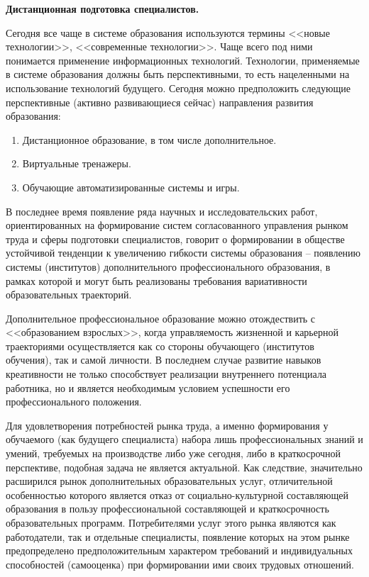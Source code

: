\textbf{Дистанционная подготовка специалистов.}

Сегодня все чаще в системе образования используются термины <<новые технологии>>,
<<современные технологии>>. Чаще всего под ними понимается применение информационных технологий. Технологии, применяемые в системе образования должны быть перспективными, то есть нацеленными на использование технологий будущего.
Сегодня можно предположить следующие перспективные (активно развивающиеся              
сейчас) направления развития образования: 
\begin{enumerate}
  \item Дистанционное образование, в том числе дополнительное. 
  \item Виртуальные тренажеры. 
  \item Обучающие автоматизированные системы и игры. 
\end{enumerate}
В последнее время появление ряда научных и исследовательских работ, ориентированных на формирование систем согласованного управления рынком труда и сферы подготовки специалистов, говорит о формировании в обществе устойчивой тенденции к увеличению гибкости системы образования – появлению системы (институтов) дополнительного профессионального образования, в рамках которой и могут быть реализованы требования вариативности образовательных траекторий.

Дополнительное профессиональное образование можно отождествить с <<образованием взрослых>>, когда управляемость жизненной и карьерной траекториями осуществляется как со стороны обучающего (институтов обучения), так и самой личности. В последнем случае развитие навыков креативности не только способствует реализации внутреннего потенциала работника, но и является необходимым условием успешности его профессионального положения. 

Для удовлетворения потребностей рынка труда, а именно формирования у обучаемого (как будущего специалиста) набора лишь профессиональных знаний и умений, требуемых на производстве либо уже сегодня, либо в краткосрочной перспективе, подобная задача не является актуальной. Как следствие, значительно расширился рынок дополнительных образовательных услуг, отличительной особенностью которого является отказ от социально-культурной составляющей образования в пользу профессиональной составляющей и краткосрочность образовательных программ. Потребителями услуг этого рынка являются как работодатели, так и отдельные специалисты, появление которых на этом рынке предопределено предположительным характером требований и индивидуальных способностей (самооценка) при формировании ими своих трудовых отношений.

